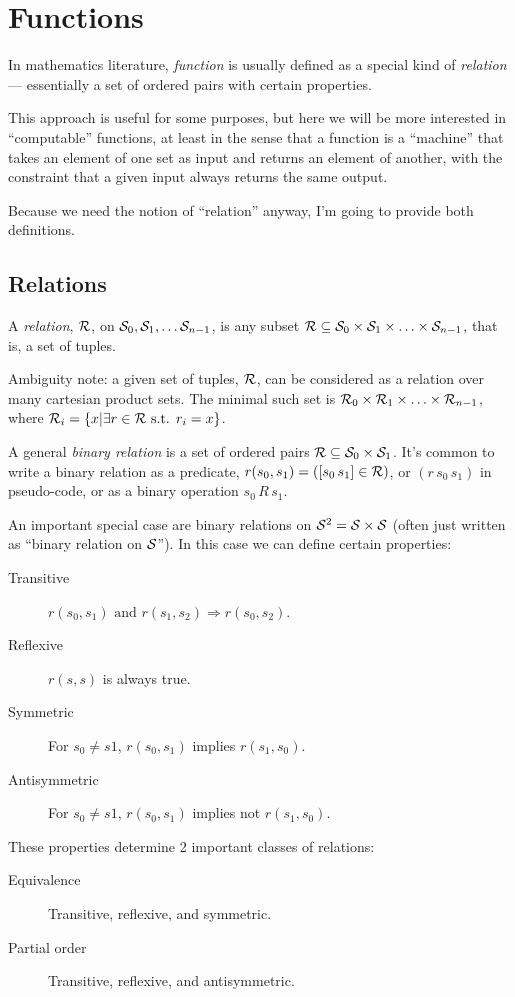 \section{Functions}
\label{sec:Functions}

In mathematics literature, \textit{function} is usually defined as
a special kind of \textit{relation} --- essentially a set of
ordered pairs with certain properties.

This approach is useful for some purposes, but here we will be
more interested in ``computable'' functions, at least in the sense
that a function is a ``machine'' that takes an element of one set
as input and returns an element of another, with the constraint
that a given input always returns the same output.

Because we need the notion of ``relation'' anyway, I'm going to
provide both definitions.

\subsection{Relations}

A \textit{relation}, 
$\mathcal{R}$, on $\mathcal{S}_0, \mathcal{S}_1, \ldots \mathcal{S}_{n-1}$,  
is any subset 
$\mathcal{R} \subseteq \mathcal{S}_0 \times \mathcal{S}_1 \times \ldots 
\times \mathcal{S}_{n-1}$,
that is, a set of tuples.

Ambiguity note: a given set of tuples, $\mathcal{R}$, can be
considered as a relation over many cartesian product sets.
The minimal such set is 
$\mathcal{R}_0 \times \mathcal{R}_1 \times \ldots \times
\mathcal{R}_{n-1}$, 
where 
$\mathcal{R}_i = \{ x | \exists r 
\in \mathcal{R} \text{ s.t. } r_i = x\}$.

A general \textit{binary relation} is a set of ordered
pairs $\mathcal{R} \subseteq \mathcal{S}_0 \times \mathcal{S}_1$.
It's common to write a binary relation as a predicate, 
$r(s_0,s_1) = ([s_0 \, s_1] \in \mathcal{R})$,
or $(r \, s_0 \, s_1)$ in pseudo-code,
or as a binary operation $s_0 \, R \, s_1$.

An important special case
are binary relations on $\mathcal{S}^2 = \mathcal{S} \times \mathcal{S}$
(often just written as ``binary relation on $\mathcal{S}$''). 
In this case we can define certain properties:

\begin{description}
\item[Transitive]
$r(s_0,s_1) \text{ and } r(s_1,s_2) \Rightarrow r(s_0,s_2)$.
\item[Reflexive] $r(s,s)$ is always true.
\item[Symmetric] For $s_0 \neq s1$, $r(s_0,s_1)$ implies
$r(s_1,s_0)$.
\item[Antisymmetric] For $s_0 \neq s1$, $r(s_0,s_1)$ implies not
$r(s_1,s_0)$.
\end{description}
These properties determine 2 important classes of relations:
\begin{description}
\item[Equivalence] Transitive, reflexive, and symmetric.
\item[Partial order] Transitive, reflexive, and antisymmetric.
\end{description}

